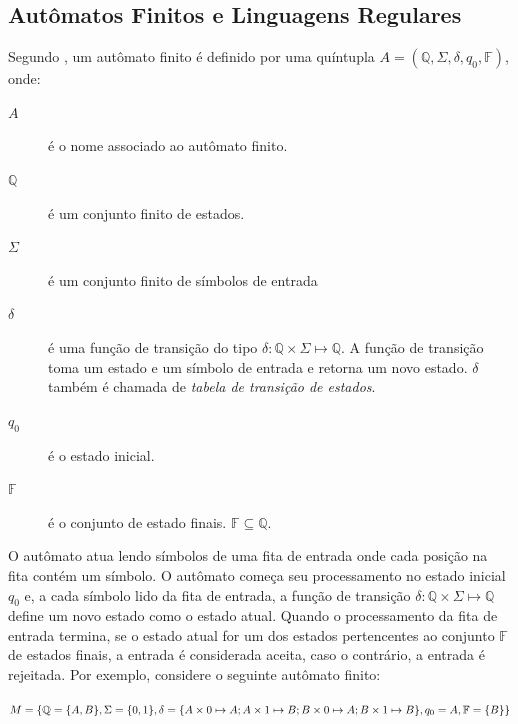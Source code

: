 \documentclass[12pt,a4paper]{article}
\begin{document}
\subsection{Autômatos Finitos e Linguagens Regulares}

Segundo , um autômato finito é definido por
uma quíntupla $A = (\mathbb{Q},\Sigma,\delta,q_0,\mathbb{F})$, onde:

\begin{description}
\item[$A$] é o nome associado ao autômato finito.
\item[$\mathbb{Q}$] é um conjunto finito de estados.
\item[$\Sigma$] é um conjunto finito de símbolos de entrada
\item[$\delta$] é uma função de transição do tipo $\delta: \mathbb{Q} \times \Sigma \mapsto \mathbb{Q}$.
A função de transição toma um estado e um símbolo de entrada e retorna um novo estado.
$\delta$ também é chamada de \textit{tabela de transição de estados}.
\item[$q_0$] é o estado inicial.
\item[$\mathbb{F}$] é o conjunto de estado finais. $\mathbb{F} \subseteq \mathbb{Q}$.
\end{description}

O autômato atua lendo símbolos de uma fita de entrada onde cada posição na fita
contém um símbolo. O autômato começa seu processamento no estado inicial $q_0$ e,
a cada símbolo lido da fita de entrada, a função de transição
$\delta: \mathbb{Q} \times \Sigma \mapsto \mathbb{Q}$ define um novo estado como o estado atual.
Quando o processamento da fita de entrada termina, se o estado atual for
um dos estados pertencentes ao conjunto $\mathbb{F}$ de estados finais, a entrada é
considerada aceita, caso o contrário, a entrada é rejeitada. Por exemplo,
considere o seguinte autômato finito:

\begin{center}
$M = \{ \mathbb{Q} = \{A,B\}, \break \Sigma = \{0,1\}, \break
\delta = \{A \times 0 \mapsto A; A \times 1 \mapsto B; B \times 0 \mapsto A; B \times 1 \mapsto B\}, \break
q_0 = A, \break \mathbb{F} = \{B\} \}$
\end{center}
\end{document}

